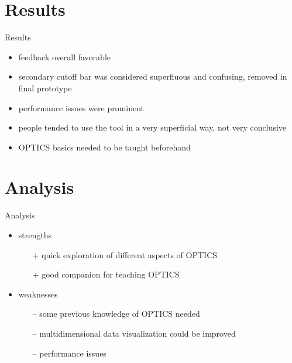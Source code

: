 \documentclass[naustrian]{beamer}
\begin{document}

\section{Results}

\begin{frame}{Results}
    \begin{itemize}
        \item feedback overall favorable
        \item secondary cutoff bar was considered superfluous and confusing, removed in final prototype
        \item performance issues were prominent
        \item people tended to use the tool in a very superficial way, not very conclusive
        \item OPTICS basics needed to be taught beforehand
    \end{itemize}
\end{frame}

\section{Analysis}

\begin{frame}{Analysis}
    \begin{itemize}
        \item strengths
            \begin{itemize}
                \item[\color{asparagus}+] quick exploration of different aspects of OPTICS
                \item[\color{asparagus}+] good companion for teaching OPTICS
            \end{itemize}
        \item weaknesses
            \begin{itemize}
                \item[\color{alizarin}--] some previous knowledge of OPTICS needed
                \item[\color{alizarin}--] multidimensional data visualization could be improved
                \item[\color{alizarin}--] performance issues
            \end{itemize}
    \end{itemize}
\end{frame}

\end{document}
